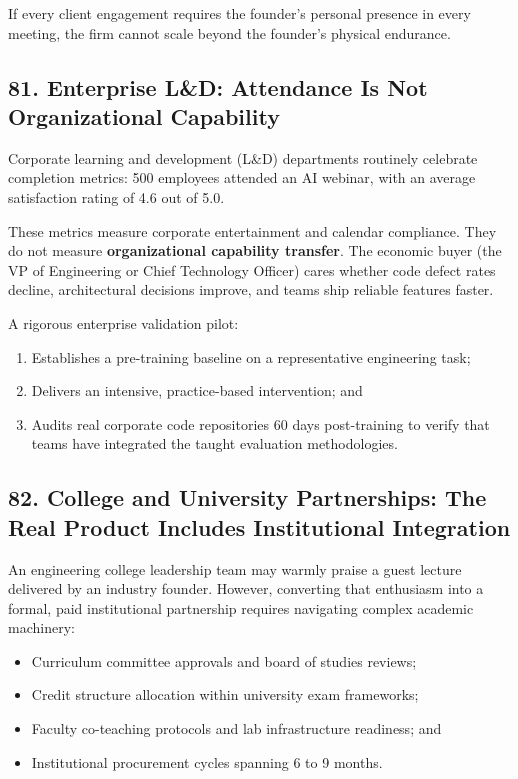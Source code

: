 If every client engagement requires the founder's personal presence in every meeting, the firm cannot scale beyond the founder's physical endurance.

\subsection*{81. Enterprise L\&D: Attendance Is Not Organizational Capability}

Corporate learning and development (L\&D) departments routinely celebrate completion metrics: 500 employees attended an AI webinar, with an average satisfaction rating of 4.6 out of 5.0.

These metrics measure corporate entertainment and calendar compliance. They do not measure \textbf{organizational capability transfer}. The economic buyer (the VP of Engineering or Chief Technology Officer) cares whether code defect rates decline, architectural decisions improve, and teams ship reliable features faster.

A rigorous enterprise validation pilot:
\begin{enumerate}
    \item Establishes a pre-training baseline on a representative engineering task;
    \item Delivers an intensive, practice-based intervention; and
    \item Audits real corporate code repositories 60 days post-training to verify that teams have integrated the taught evaluation methodologies.
\end{enumerate}

\subsection*{82. College and University Partnerships: The Real Product Includes Institutional Integration}

An engineering college leadership team may warmly praise a guest lecture delivered by an industry founder. However, converting that enthusiasm into a formal, paid institutional partnership requires navigating complex academic machinery:
\begin{itemize}
    \item Curriculum committee approvals and board of studies reviews;
    \item Credit structure allocation within university exam frameworks;
    \item Faculty co-teaching protocols and lab infrastructure readiness; and
    \item Institutional procurement cycles spanning 6 to 9 months.
\end{itemize}

